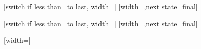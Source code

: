 %

{
  [switch if less than=\pgfsnakesegmentlength to last,
                   width=\pgfsnakesegmentlength]
  {
    \pgfpathmoveto{\pgfpoint{0pt}{\pgfsnakesegmentamplitude}}
    \pgfpathlineto{\pgfpoint{\pgfsnakesegmentobjectlength}{0pt}}
    \pgfpathlineto{\pgfpoint{0pt}{-\pgfsnakesegmentamplitude}}
    \pgfpathclose
  }
  [width=\pgfsnakesegmentobjectlength,next state=final]
  {
    \pgfpathmoveto{\pgfpoint{0pt}{\pgfsnakesegmentamplitude}}
    \pgfpathlineto{\pgfpoint{\pgfsnakesegmentobjectlength}{0pt}}
    \pgfpathlineto{\pgfpoint{0pt}{-\pgfsnakesegmentamplitude}}
    \pgfpathclose
  }
  {
    \pgfpathmoveto{\pgfpoint{\pgfsnakeremainingdistance}{0pt}}
  }
}



%

{
  [switch if less than=\pgfsnakesegmentlength to last,
                   width=\pgfsnakesegmentlength]
  {
    \pgfpathmoveto{\pgfpoint{0pt}{\pgfsnakesegmentamplitude}}
    \pgfpathlineto{\pgfpoint{\pgfsnakesegmentobjectlength}{-\pgfsnakesegmentamplitude}}
    \pgfpathmoveto{\pgfpoint{0pt}{-\pgfsnakesegmentamplitude}}
    \pgfpathlineto{\pgfpoint{\pgfsnakesegmentobjectlength}{\pgfsnakesegmentamplitude}}
  }
  [width=\pgfsnakesegmentobjectlength,next state=final]
  {
    \pgfpathmoveto{\pgfpoint{0pt}{\pgfsnakesegmentamplitude}}
    \pgfpathlineto{\pgfpoint{\pgfsnakesegmentobjectlength}{-\pgfsnakesegmentamplitude}}
    \pgfpathmoveto{\pgfpoint{0pt}{-\pgfsnakesegmentamplitude}}
    \pgfpathlineto{\pgfpoint{\pgfsnakesegmentobjectlength}{\pgfsnakesegmentamplitude}}
  }
  {
    \pgfpathmoveto{\pgfpoint{\pgfsnakeremainingdistance}{0pt}}
  }
}



%

{
  [width=\pgfsnakesegmentlength]
  {
    \pgfpathmoveto{\pgfpoint{0pt}{\pgfsnakesegmentamplitude}}
    \pgfpathlineto{\pgfpoint{0pt}{-\pgfsnakesegmentamplitude}}
  }
  {
    \pgfpathmoveto{\pgfpoint{0pt}{\pgfsnakesegmentamplitude}}
    \pgfpathlineto{\pgfpoint{0pt}{-\pgfsnakesegmentamplitude}}
    \pgfpathmoveto{\pgfpoint{\pgfsnakeremainingdistance}{0pt}}
  }
}


